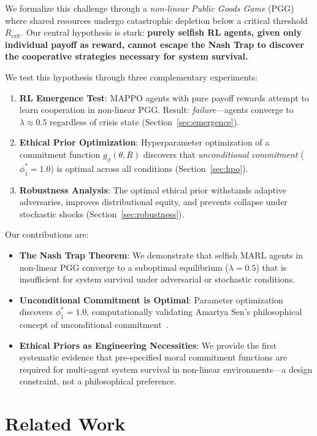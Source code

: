 \documentclass{article}
\begin{document}
We formalize this challenge through a \emph{non-linear Public Goods Game} (PGG) where shared resources undergo catastrophic depletion below a critical threshold $R_{\text{crit}}$.
Our central hypothesis is stark: \textbf{purely selfish RL agents, given only individual payoff as reward, cannot escape the Nash Trap to discover the cooperative strategies necessary for system survival.}

We test this hypothesis through three complementary experiments:
\begin{enumerate}
    \item \textbf{RL Emergence Test}: MAPPO agents with pure payoff rewards attempt to learn cooperation in non-linear PGG. Result: \emph{failure}---agents converge to $\lambda \approx 0.5$ regardless of crisis state (Section~\ref{sec:emergence}).
    \item \textbf{Ethical Prior Optimization}: Hyperparameter optimization of a commitment function $g_\phi(\theta, R)$ discovers that \emph{unconditional commitment} ($\phi_1^* = 1.0$) is optimal across all conditions (Section~\ref{sec:hpo}).
    \item \textbf{Robustness Analysis}: The optimal ethical prior withstands adaptive adversaries, improves distributional equity, and prevents collapse under stochastic shocks (Section~\ref{sec:robustness}).
\end{enumerate}

Our contributions are:
\begin{itemize}
    \item[(C1)] \textbf{The Nash Trap Theorem}: We demonstrate that selfish MARL agents in non-linear PGG converge to a suboptimal equilibrium ($\lambda = 0.5$) that is insufficient for system survival under adversarial or stochastic conditions.
    \item[(C2)] \textbf{Unconditional Commitment is Optimal}: Parameter optimization discovers $\phi_1^* = 1.0$, computationally validating Amartya Sen's philosophical concept of unconditional commitment~\cite{sen1977rational}.
    \item[(C3)] \textbf{Ethical Priors as Engineering Necessities}: We provide the first systematic evidence that pre-specified moral commitment functions are required for multi-agent system survival in non-linear environments---a design constraint, not a philosophical preference.
\end{itemize}

\section{Related Work}
\end{document}
